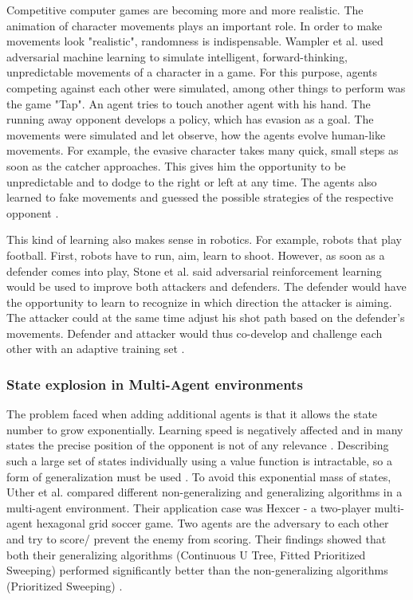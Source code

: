 Competitive computer games are becoming more and more realistic. The animation of character movements plays an important role. In order to make movements look "realistic", randomness is indispensable. Wampler et al. \cite{animationwampler2010character} used adversarial machine learning to simulate intelligent, forward-thinking, unpredictable movements of a character in a game. 
For this purpose, agents competing against each other were simulated, among other things to perform was the game "Tap". An agent tries to touch another agent with his hand. The running away opponent develops a policy, which has evasion as a goal.
The movements were simulated and let observe, how the agents evolve human-like movements. For example, the evasive character takes many quick, small steps as soon as the catcher approaches. This gives him the opportunity to be unpredictable and to dodge to the right or left at any time.
The agents also learned to fake movements and guessed the possible strategies of the respective opponent \cite{animationwampler2010character}.

This kind of learning also makes sense in robotics. For example, robots that play football. First, robots have to run, aim, learn to shoot. However, as soon as a defender comes into play, Stone et al. \cite{roboticstone1998towards} said adversarial reinforcement learning would be used to improve both attackers and defenders. The defender would have the opportunity to learn to recognize in which direction the attacker is aiming. The attacker could at the same time adjust his shot path based on the defender's movements. 
Defender and attacker would thus co-develop and challenge each other with an adaptive training set \cite{roboticstone1998towards}.

\subsubsection{State explosion in Multi-Agent environments}

The problem faced when adding additional agents is that it allows the state number to grow exponentially. Learning speed is negatively affected and in many states the precise position of the opponent is not of any relevance \cite{multiuther1997generalizing}.
Describing such a large set of states individually using a value function is intractable, so a form of generalization must be used \cite{boyan1995generalization}. 
To avoid this exponential mass of states, Uther et al. \cite{multiuther1997generalizing} compared different non-generalizing and generalizing algorithms in a multi-agent environment. 
Their application case was Hexcer - a two-player multi-agent hexagonal grid soccer game. Two agents are the adversary to each other and try to score/ prevent the enemy from scoring. Their findings showed that both their generalizing algorithms (Continuous U Tree, Fitted Prioritized Sweeping) performed significantly better than the non-generalizing algorithms (Prioritized Sweeping) \cite{multiuther1997generalizing}.

